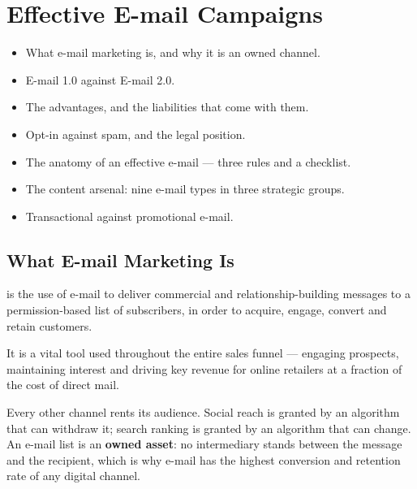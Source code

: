 
\chapter{Effective E-mail Campaigns}


\begin{learningoutcomes}
\begin{itemize}
\item What e-mail marketing is, and why it is an owned channel.
\item E-mail 1.0 against E-mail 2.0.
\item The advantages, and the liabilities that come with them.
\item Opt-in against spam, and the legal position.
\item The anatomy of an effective e-mail --- three rules and a checklist.
\item The content arsenal: nine e-mail types in three strategic groups.
\item Transactional against promotional e-mail.
\end{itemize}
\end{learningoutcomes}

\section{What E-mail Marketing Is}

\begin{definitionbox}
 is the use of e-mail to deliver
commercial and relationship-building messages to a permission-based list of
subscribers, in order to acquire, engage, convert and retain customers.
\end{definitionbox}

It is a vital tool used throughout the entire sales funnel --- engaging
prospects, maintaining interest and driving key revenue for online retailers at a
fraction of the cost of direct mail.

\begin{keybox}
Every other channel rents its audience. Social reach is granted by an algorithm
that can withdraw it; search ranking is granted by an algorithm that can change.
An e-mail list is an \textbf{owned asset}: no intermediary stands between the
message and the recipient, which is why e-mail has the highest conversion and
retention rate of any digital channel.
\end{keybox}

